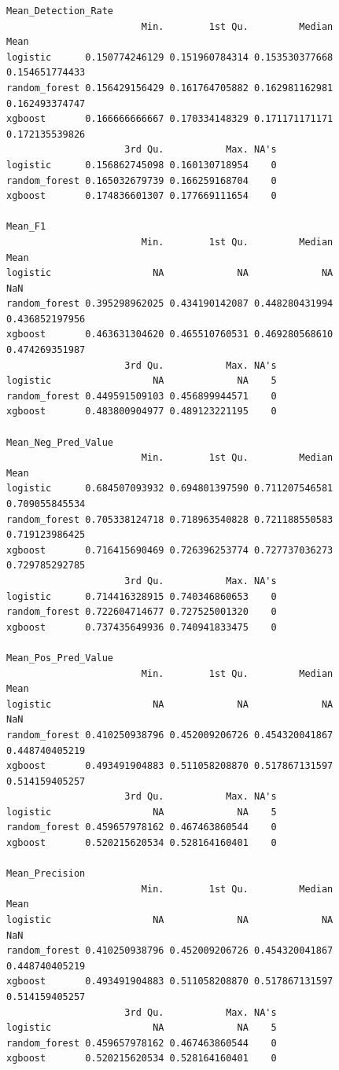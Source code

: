 \documentclass[
  letterpaper,
  DIV=11,
  numbers=noendperiod]{scrartcl}
\begin{document}
\begin{verbatim}
Mean_Detection_Rate 
                        Min.        1st Qu.         Median           Mean
logistic      0.150774246129 0.151960784314 0.153530377668 0.154651774433
random_forest 0.156429156429 0.161764705882 0.162981162981 0.162493374747
xgboost       0.166666666667 0.170334148329 0.171171171171 0.172135539826
                     3rd Qu.           Max. NA's
logistic      0.156862745098 0.160130718954    0
random_forest 0.165032679739 0.166259168704    0
xgboost       0.174836601307 0.177669111654    0

Mean_F1 
                        Min.        1st Qu.         Median           Mean
logistic                  NA             NA             NA            NaN
random_forest 0.395298962025 0.434190142087 0.448280431994 0.436852197956
xgboost       0.463631304620 0.465510760531 0.469280568610 0.474269351987
                     3rd Qu.           Max. NA's
logistic                  NA             NA    5
random_forest 0.449591509103 0.456899944571    0
xgboost       0.483800904977 0.489123221195    0

Mean_Neg_Pred_Value 
                        Min.        1st Qu.         Median           Mean
logistic      0.684507093932 0.694801397590 0.711207546581 0.709055845534
random_forest 0.705338124718 0.718963540828 0.721188550583 0.719123986425
xgboost       0.716415690469 0.726396253774 0.727737036273 0.729785292785
                     3rd Qu.           Max. NA's
logistic      0.714416328915 0.740346860653    0
random_forest 0.722604714677 0.727525001320    0
xgboost       0.737435649936 0.740941833475    0

Mean_Pos_Pred_Value 
                        Min.        1st Qu.         Median           Mean
logistic                  NA             NA             NA            NaN
random_forest 0.410250938796 0.452009206726 0.454320041867 0.448740405219
xgboost       0.493491904883 0.511058208870 0.517867131597 0.514159405257
                     3rd Qu.           Max. NA's
logistic                  NA             NA    5
random_forest 0.459657978162 0.467463860544    0
xgboost       0.520215620534 0.528164160401    0

Mean_Precision 
                        Min.        1st Qu.         Median           Mean
logistic                  NA             NA             NA            NaN
random_forest 0.410250938796 0.452009206726 0.454320041867 0.448740405219
xgboost       0.493491904883 0.511058208870 0.517867131597 0.514159405257
                     3rd Qu.           Max. NA's
logistic                  NA             NA    5
random_forest 0.459657978162 0.467463860544    0
xgboost       0.520215620534 0.528164160401    0


\end{verbatim}
\end{document}
